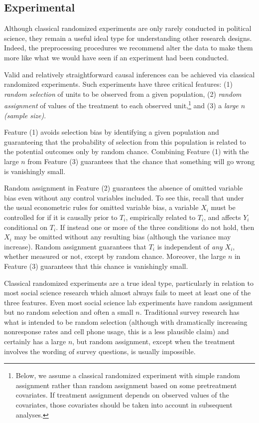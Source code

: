 \documentclass[11pt,titlepage]{article}
\begin{document}
\subsection{Experimental}

Although classical randomized experiments are only rarely conducted in
political science, they remain a useful ideal type for understanding
other research designs.  Indeed, the preprocessing procedures we
recommend alter the data to make them more like what we would have
seen if an experiment had been conducted.

Valid and relatively straightforward causal inferences can be achieved
via classical randomized experiments.  Such experiments have three
critical features: (1) \emph{random selection} of units to be observed
from a given population, (2) \emph{random assignment} of values of the
treatment to each observed unit,\footnote{Below, we assume a classical
  randomized experiment with simple random assignment rather than
  random assignment based on some pretreatment covariates.  If
  treatment assignment depends on observed values of the covariates,
  those covariates should be taken into account in subsequent analyses.}
and (3) a \emph{large $n$ (sample size)}.

Feature (1) avoids selection bias by identifying a given population
and guaranteeing that the probability of selection from this
population is related to the potential outcomes only by random chance.
Combining Feature (1) with the large $n$ from Feature (3) guarantees
that the chance that something will go wrong is vanishingly small.

Random assignment in Feature (2) guarantees the absence of omitted
variable bias even without any control variables included.  To see
this, recall that under the usual econometric rules for omitted
variable bias, a variable $X_i$ must be controlled for if it is
causally prior to $T_i$, empirically related to $T_i$, and affects
$Y_i$ conditional on $T_i$.  If instead one or more of the three
conditions do not hold, then $X_i$ may be omitted without any
resulting bias (although the variance may increase).  Random
assignment guarantees that $T_i$ is independent of \emph{any} $X_i$,
whether measured or not, except by random chance.  Moreover, the large
$n$ in Feature (3) guarantees that this chance is vanishingly small.

Classical randomized experiments are a true ideal type, particularly
in relation to most social science research which almost always fails
to meet at least one of the three features.  Even most social science
lab experiments have random assignment but no random selection and
often a small $n$.  Traditional survey research has what is intended
to be random selection (although with dramatically increasing
nonresponse rates and cell phone usage, this is a less plausible
claim) and certainly has a large $n$, but random assignment, except
when the treatment involves the wording of survey questions, is
usually impossible.
\end{document}
